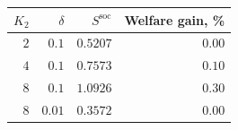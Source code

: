 \begin{tabular}{rrrr}
\toprule
$K_2$ & $\delta$ & $S^{\mathrm{soc}}$ & Welfare gain, \%\\
\midrule
$2$ & $0.1$ & $0.5207$ & $0.00$\\
$4$ & $0.1$ & $0.7573$ & $0.10$\\
$8$ & $0.1$ & $1.0926$ & $0.30$\\
$8$ & $0.01$ & $0.3572$ & $0.00$\\
\bottomrule
\end{tabular}

